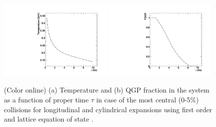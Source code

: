 \documentclass[aps,prc,preprint,superscriptaddress,showpacs,showkeys]{revtex4-1}
\begin{document}
\begin{figure}
\includegraphics[width=0.49\textwidth]{LHC_TempVsTau.pdf}
\includegraphics[width=0.49\textwidth]{LHC_FQGPVsTau.pdf}
\caption{(Color online) (a) Temperature and (b) QGP fraction in the system as a function of proper 
time $\tau$ in case of the most central (0-5$\%$) collisions for longitudinal and cylindrical expansions 
using first order and lattice equation of state . }
\label{fig:TauVsTemp}
\end{figure}




\end{document}
